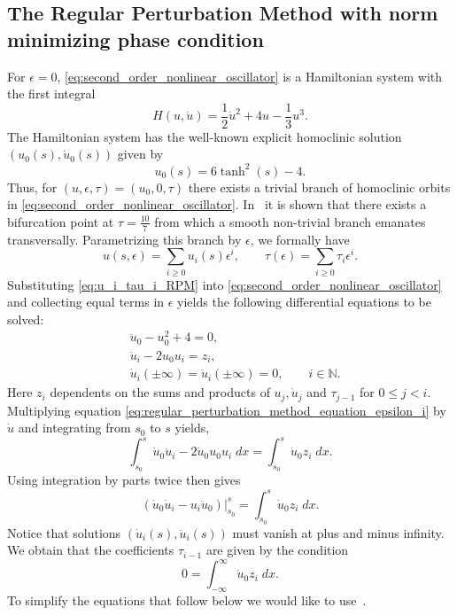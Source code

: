 \subsection{The Regular Perturbation Method with norm minimizing phase condition}
\label{sec:RPM_norm_minimizing_phase condition}
For $\epsilon=0$, \cref{eq:second_order_nonlinear_oscillator} is a Hamiltonian
system with the first integral
\begin{equation*}
    H(u,\dot u) = \frac12 \dot u^2+4u-\frac13 u^3.
\end{equation*}
The Hamiltonian system has the well-known explicit homoclinic solution
$(u_0(s),\dot u_0(s))$ given by
\[
    u_{0}(s) = 6 \tanh^2(s) - 4.
\]
Thus, for $(u, \epsilon, \tau) = (u_0, 0, \tau)$ there exists a trivial branch
of homoclinic orbits in \cref{eq:second_order_nonlinear_oscillator}.
In~\cite{Beyn_1994} it is shown that there exists a bifurcation point at
$\tau=\frac{10}{7}$ from which a smooth non-trivial branch emanates
transversally. Parametrizing this branch by $\epsilon$, we formally have
\begin{equation}
    \label{eq:u_i_tau_i_RPM}
    u(s,\epsilon) = \sum_{i\geq 0} u_i(s) \epsilon^i, 
    \qquad 
    \tau(\epsilon) = \sum_{i\geq 0} \tau_i \epsilon^i.
\end{equation}
Substituting \cref{eq:u_i_tau_i_RPM} into
\cref{eq:second_order_nonlinear_oscillator} and collecting equal terms in
$\epsilon$ yields the following differential equations to be solved:
\begin{align}
  &\ddot u_0 - u_0^2 +4 = 0, \label{eq:z0} \\
  &\ddot u_i - 2 u_0 u_i
    =
    z_i, 
        \label{eq:regular_perturbation_method_equation_epsilon_i} \\
  &\dot u_i (\pm \infty) = \ddot u_i (\pm \infty) = 0,
        \qquad i\in \mathbb N. \nonumber
\end{align}
Here $z_i$ dependents on the sums and products of $u_j, \dot u_j$ and $\tau_{j-1}$
for $0\leq j < i$.  Multiplying equation
\cref{eq:regular_perturbation_method_equation_epsilon_i} by $\dot u$ and
integrating from $s_0$ to $s$ yields,
\[
  \int_{s_0}^s \dot u_0 \ddot u_i - 2 \dot u_0 u_0 u_i \;dx = \int_{s_0}^s \dot
  u_0 z_i \; dx.
\]
Using integration by parts twice then gives
\begin{equation}
  \label{eq:regular_perturbation_method_integration_by_parts}
  \left. \left( \dot u_0 \dot u_i - u_i \ddot u_0 \right)\right|_{s_0}^s = \int_{s_0}^s \dot
  u_0 z_i \; dx.
\end{equation}
Notice that solutions $(\dot u_i(s),\ddot u_i(s))$ must vanish at plus and minus
infinity. We obtain that the coefficients $\tau_{i-1}$ are given by the condition
\begin{equation*}
    0 = \int_{-\infty}^\infty \dot u_0 z_i \; dx.
\end{equation*}
To simplify the equations that follow below we would like to
use~\cite[Proposition 4.2]{Beyn_1994}. 

